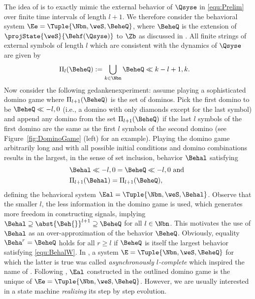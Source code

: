 

The idea of \SAlA is to exactly mimic the external behavior of $\Qsyse$ in \eqref{equ:Prelim} over finite time intervals of length $l+1$. 
We therefore consider the behavioral system $\Ee=\Tuple{\Nbn,\weS,\BeheQ}$, where $\BeheQ$ is the extension of $\projState{\weS}{\Behf(\Qsyse)}$ to $\Zb$ as discussed in . 
All finite strings of external symbols of length $l$ which are consistent with the dynamics of $\Qsyse$ are given by
\begin{align}
&\Pi_{l}(\BeheQ):=\bigcup_{k\in\Nbn}\BeheQ\ll{k-l+1,k}.\label{equ:Ds}
\end{align}
Now consider the following gedankenexperiment: assume playing a sophisticated domino game where $\Pi_{l+1}(\BeheQ)$ is the set of dominos. Pick the first domino to be $\BeheQ\ll{-l,0}$ (i.e., a domino with only diamonds except for the last symbol) and append any domino from the set $\Pi_{l+1}(\BeheQ)$ if the last $l$ symbols of the first domino are the same as the first $l$ symbols of the second domino (see Figure~\ref{fig:DominoGame} (left) for an example).
Playing the domino game arbitrarily long and with all possible initial conditions and domino combinations results in the largest, in the sense of set inclusion, behavior $\Behal$ satisfying 
\begin{subequations}\label{equ:BehalW}
\begin{align}
 &\Behal\ll{-l,0}=\BeheQ\ll{-l,0}~\text{and}~\label{equ:BehalW:a}\\
 &\Pi_{l+1}(\Behal)=\Pi_{l+1}(\BeheQ), \label{equ:BehalW:b}
 \end{align}
\end{subequations}
defining the behavioral system ${\Eal=\Tuple{\Nbn,\weS,\Behal}}$.
Observe that the smaller $l$, the less information in the domino game is used, which generates more freedom in constructing signals, implying $\Behal\supseteq\allowbreak\abst{\Beh{}}^{l+1}\supseteq\allowbreak\BeheQ$ for all $l\in\Nbn$. 
This motivates the use of $\Behal$ as an over-approximation of the behavior $\BeheQ$.
Obviously, equality ${\Beha^r=\BeheQ}$ holds for all $r\geq l$ if $\BeheQ$ is itself the largest behavior satisfying \eqref{equ:BehalW}. In \cite{SchmuckRaisch2014_ControlLetters}, a system $\E=\Tuple{\Nbn,\weS,\BeheQ}$ for which the latter is true was called \emph{asynchronously $l$-complete} which inspired the name of \SAlA. Following \cite{SchmuckRaisch2014_ControlLetters}, $\Eal$ constructed in the outlined domino game is the unique \SAlA of $\Ee=\Tuple{\Nbn,\weS,\BeheQ}$.  However, we are usually interested in a state machine \emph{realizing} its step by step evolution.


